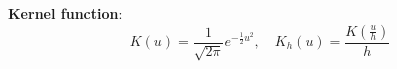 \documentclass {article}
\begin{document}
\textbf{Kernel function}: 
$$
K(u) = 
\frac{1}{\sqrt{2\pi}} e^{-\frac{1}{2}u^2}, 
\quad K_h(u) 
= \frac{K(\frac u h)}{h}
$$



%
%
%
%	
%	
%
%	
%
%
\end{document}
